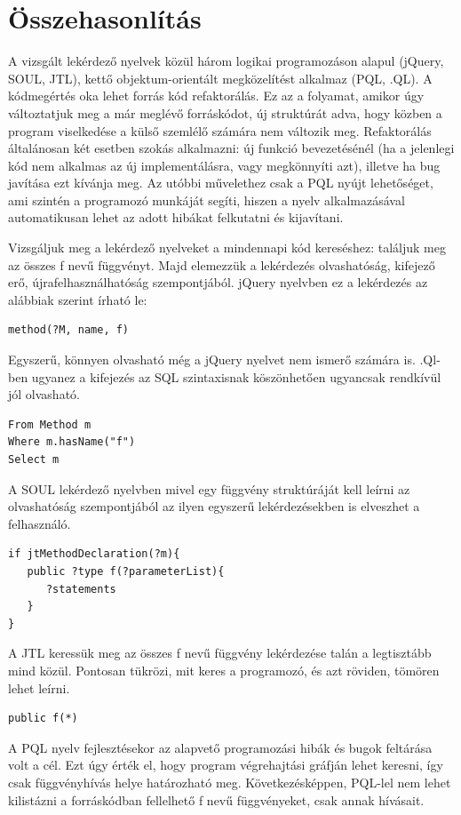 \documentclass[a4paper,12pt]{report}
\begin{document}
\section{Összehasonlítás}
\par A vizsgált lekérdező nyelvek közül három logikai programozáson alapul (jQuery, SOUL, JTL), kettő objektum-orientált megközelítést alkalmaz (PQL, .QL). A kódmegértés oka lehet forrás kód refaktorálás. Ez az a folyamat, amikor úgy változtatjuk meg a már meglévő forráskódot, új struktúrát adva, hogy közben a program viselkedése a külső szemlélő számára nem változik meg. Refaktorálás általánosan két esetben szokás alkalmazni: új funkció bevezetésénél (ha a jelenlegi kód nem alkalmas az új implementálásra, vagy megkönnyíti azt), illetve ha bug javítása ezt kívánja meg. Az utóbbi művelethez csak a PQL nyújt lehetőséget, ami szintén a programozó munkáját segíti, hiszen a nyelv alkalmazásával automatikusan lehet az adott hibákat felkutatni és kijavítani.
\par Vizsgáljuk meg a lekérdező nyelveket a mindennapi kód kereséshez: találjuk meg az összes f nevű függvényt. Majd elemezzük a lekérdezés olvashatóság, kifejező erő, újrafelhasználhatóság szempontjából. 
jQuery nyelvben ez a lekérdezés az alábbiak szerint írható le:
\begin{verbatim}
method(?M, name, f)
\end{verbatim}
Egyszerű, könnyen olvasható még a jQuery nyelvet nem ismerő számára is.
.Ql-ben ugyanez a kifejezés az SQL szintaxisnak köszönhetően ugyancsak rendkívül jól olvasható.
\begin{verbatim}
From Method m
Where m.hasName("f")
Select m
\end{verbatim}
A SOUL lekérdező nyelvben mivel egy függvény struktúráját kell leírni az olvashatóság szempontjából az ilyen egyszerű lekérdezésekben is elveszhet a felhasználó. 
\begin{verbatim}
if jtMethodDeclaration(?m){
   public ?type f(?parameterList){
      ?statements
   }
}
\end{verbatim}
A JTL keressük meg az összes f nevű függvény lekérdezése talán a legtisztább mind közül. Pontosan tükrözi, mit keres a programozó, és azt röviden, tömören lehet leírni.
\begin{verbatim}
public f(*)
\end{verbatim}
A PQL nyelv fejlesztésekor az alapvető programozási hibák és bugok feltárása volt a cél. Ezt úgy érték el, hogy program végrehajtási gráfján lehet keresni, így csak függvényhívás helye határozható meg. Következésképpen, PQL-lel nem lehet kilistázni a forráskódban fellelhető f nevű függvényeket, csak annak hívásait.
\end{document}

